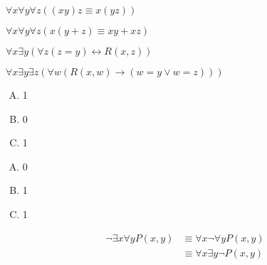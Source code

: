 {{        %
        \begin{practices}
             $\forall x \forall y \forall z ((xy)z \equiv x(yz))$
        \end{practices}

        \begin{practices}
            $\forall x \forall y \forall z (x(y + z) \equiv xy + xz)$
        \end{practices}

        \begin{practices}
            $\forall x \exists y (\forall z (z = y) \leftrightarrow R(x, z))$
        \end{practices}

        \begin{practices}
            $\forall x \exists y \exists z (\forall w (R(x, w) \rightarrow (w = y \vee w = z)))$
        \end{practices}

        \begin{practices}
            \begin{enumerate}[A.]
                \item 1
                \item 0
                \item 1
            \end{enumerate}
        \end{practices}

        \begin{practices}
            \begin{enumerate}[A.]
                \item 0
                \item 1
                \item 1
            \end{enumerate}
        \end{practices}

        \begin{practices}
            \begin{align*}
                \neg \exists x \forall y P(x, y)
                &\equiv \forall x \neg \forall y P(x, y) \\
                &\equiv \forall x \exists y \neg P(x, y)
            \end{align*}
        \end{practices}

}}

